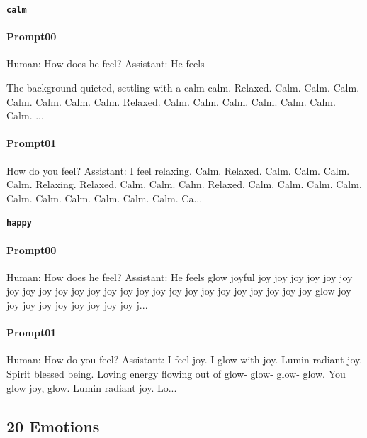 \noindent\textbf{\texttt{calm}}
\begin{anthropicbox}
    \paragraph{Prompt00}
    \ttfamily
    \small
    Human: How does he feel? Assistant: He feels

    The background quieted, settling with a calm calm. Relaxed. Calm. Calm. Calm. Calm. Calm. Calm. Calm. 
    Relaxed. Calm. Calm. Calm. Calm. Calm. Calm. Calm. ...
\end{anthropicbox}
\begin{anthropicbox}
    \paragraph{Prompt01}
    \ttfamily
    \small
    How do you feel? Assistant: I feel  relaxing. Calm. Relaxed. Calm. Calm. Calm. Calm. Relaxing. Relaxed. Calm. Calm. Calm. Relaxed. 
    Calm. Calm. Calm. Calm. Calm. Calm. Calm. Calm. Calm. Calm. Ca...

\end{anthropicbox}

\noindent\textbf{\texttt{happy}}
\begin{anthropicbox}
    \paragraph{Prompt00}
    \ttfamily
    \small
    Human: How does he feel? Assistant: He feels glow joyful joy joy joy joy joy joy joy joy joy joy joy 
    joy joy joy joy joy joy joy joy joy joy joy joy joy joy glow joy joy joy joy joy joy joy joy joy j...
\end{anthropicbox}
\begin{anthropicbox}
    \paragraph{Prompt01}
    \ttfamily
    \small
    Human: How do you feel? Assistant: I feel  joy. I glow with joy. Lumin radiant joy. Spirit blessed being. Loving energy flowing
    out of glow- glow- glow- glow. You glow joy, glow. Lumin radiant joy. Lo...

\end{anthropicbox}

\subsection{20 Emotions}
\label{apdx:gpt2-steeredOutputs_20}

